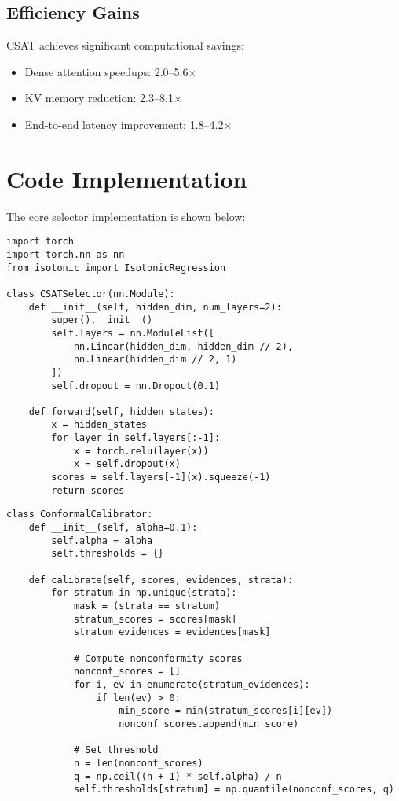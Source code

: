 \documentclass[11pt]{article}
\begin{document}
\subsection{Efficiency Gains}
CSAT achieves significant computational savings:
\begin{itemize}
\item Dense attention speedups: 2.0--5.6$\times$
\item KV memory reduction: 2.3--8.1$\times$
\item End-to-end latency improvement: 1.8--4.2$\times$
\end{itemize}

\section{Code Implementation}

The core selector implementation is shown below:

\begin{lstlisting}[style=py]
import torch
import torch.nn as nn
from isotonic import IsotonicRegression

class CSATSelector(nn.Module):
    def __init__(self, hidden_dim, num_layers=2):
        super().__init__()
        self.layers = nn.ModuleList([
            nn.Linear(hidden_dim, hidden_dim // 2),
            nn.Linear(hidden_dim // 2, 1)
        ])
        self.dropout = nn.Dropout(0.1)
        
    def forward(self, hidden_states):
        x = hidden_states
        for layer in self.layers[:-1]:
            x = torch.relu(layer(x))
            x = self.dropout(x)
        scores = self.layers[-1](x).squeeze(-1)
        return scores
\end{lstlisting}

\begin{lstlisting}[style=py]
class ConformalCalibrator:
    def __init__(self, alpha=0.1):
        self.alpha = alpha
        self.thresholds = {}
        
    def calibrate(self, scores, evidences, strata):
        for stratum in np.unique(strata):
            mask = (strata == stratum)
            stratum_scores = scores[mask]
            stratum_evidences = evidences[mask]
            
            # Compute nonconformity scores
            nonconf_scores = []
            for i, ev in enumerate(stratum_evidences):
                if len(ev) > 0:
                    min_score = min(stratum_scores[i][ev])
                    nonconf_scores.append(min_score)
            
            # Set threshold
            n = len(nonconf_scores)
            q = np.ceil((n + 1) * self.alpha) / n
            self.thresholds[stratum] = np.quantile(nonconf_scores, q)
\end{lstlisting}
\end{document}
